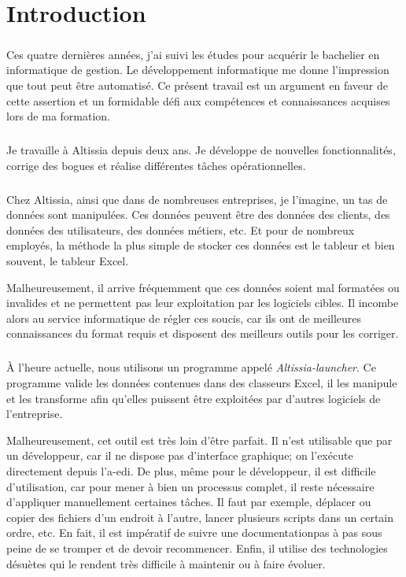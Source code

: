 \chapter{Introduction}
\label{ch:introduction}

\paragraph{}
Ces quatre dernières années, j'ai suivi les études pour acquérir le bachelier en informatique de gestion.
Le développement informatique me donne l'impression que tout peut être automatisé.
Ce présent travail est un argument en faveur de cette assertion et un formidable défi aux compétences et connaissances acquises lors de ma formation.

\paragraph{}
Je travaille à Altissia depuis deux ans.
Je développe de nouvelles fonctionnalités, corrige des bogues et réalise différentes tâches opérationnelles.

\paragraph{}
Chez Altissia, ainsi que dans de nombreuses entreprises, je l'imagine, un tas de données sont manipulées.
Ces données peuvent être des données des clients, des données des utilisateurs, des données métiers, etc.
Et pour de nombreux employés, la méthode la plus simple de stocker ces données est le tableur et bien souvent, le tableur Excel.

Malheureusement, il arrive fréquemment que ces données soient mal formatées ou invalides et ne permettent pas leur exploitation par les logiciels cibles.
Il incombe alors au service informatique de régler ces soucis, car ils ont de meilleures connaissances du format requis et disposent des meilleurs outils pour les corriger.

\paragraph{}
À l'heure actuelle, nous utilisons un programme appelé \textit{Altissia-launcher}.
Ce programme valide les données contenues dans des classeurs Excel, il les manipule et les transforme afin qu'elles puissent être exploitées par d'autres logiciels de l'entreprise.

Malheureusement, cet outil est très loin d'être parfait.
Il n'est utilisable que par un développeur, car il ne dispose pas d'interface graphique; on l'exécute directement depuis l'\gls{a-edi}.
De plus, même pour le développeur, il est difficile d'utilisation, car pour mener à bien un processus complet, il reste nécessaire d'appliquer manuellement certaines tâches.
Il faut par exemple, déplacer ou copier des fichiers d'un endroit à l'autre, lancer plusieurs scripts dans un certain ordre, etc.
En fait, il est impératif de suivre une documentation\fnmark pas à pas sous peine de se tromper et de devoir recommencer.
Enfin, il utilise des technologies désuètes qui le rendent très difficile à maintenir ou à faire évoluer.


